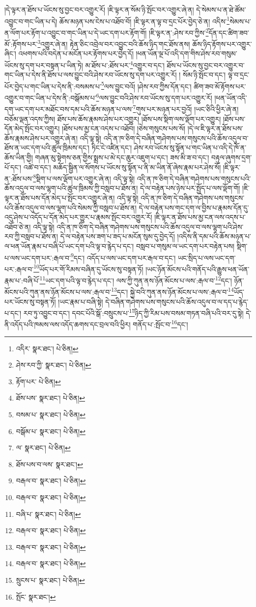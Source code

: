 །དེ་ལྟར་ན་ཐོས་པ་ཡོངས་སུ་བྱང་བར་འགྱུར་རོ། །ཇི་ལྟར་ན་སོམ་ཉི་སྤོང་བར་འགྱུར་ཞེ་ན། དེ་སེམས་པ་ན་ཐེ་ཚོམ་འབྱུང་བ་གང་ཡིན་པ་དེ། ཆོས་མཉན་པས་ངེས་པ་འཐོབ་བོ། །ཇི་ལྟར་ན་ལྟ་བ་དྲང་པོར་བྱེད་ཅེ་ན། འདིས་\footnote{འདིར་  སྣར་ཐང་།  པེ་ཅིན། }སེམས་པ་ན་ལོག་པར་རྟོག་པ་འབྱུང་བ་གང་ཡིན་པ་དེ་ཡང་དག་པར་རྟོག་གོ། །ཇི་ལྟར་ན་:ཤེས་རབ་ཀྱིས་\footnote{ཤེས་རབ་ཀྱི་  སྣར་ཐང་།  པེ་ཅིན། }དོན་དང་ཚིག་ཟབ་མོ་:རྟོགས་པར་\footnote{རྟོག་པར་  པེ་ཅིན། }འགྱུར་ཞེ་ན། རྟེན་ཅིང་འབྲེལ་བར་འབྱུང་བའི་ཆོས་ཉིད་གང་ཐོས་ནས། ཆོས་ཉིད་རྟོགས་པར་འགྱུར་ཞིང་། འཕགས་པའི་བདེན་པ་མངོན་པར་རྟོགས་པར་བྱེད་དོ། །ཕན་ཡོན་ལྔ་པོ་འདི་དག་གིས་ཤེས་རབ་གསུམ་ཡོངས་སུ་དག་པར་བསྟན་པ་ཡིན་ཏེ། མ་ཐོས་པ་:ཐོས་པར་\footnote{ཐོས་པས་  སྣར་ཐང་།  པེ་ཅིན། }འགྱུར་བ་དང་། ཐོས་པ་ཡོངས་སུ་བྱང་བར་འགྱུར་བ་གང་ཡིན་པ་དེས་ནི་ཐོས་པ་ལས་བྱུང་བའི་ཤེས་རབ་ཡོངས་སུ་དག་པར་འགྱུར་རོ། །
སོམ་ཉི་སྤོང་བ་དང་། ལྟ་བ་དྲང་པོར་བྱེད་པ་གང་ཡིན་པ་དེས་ནི་:བསམས་པ་\footnote{བསམ་པ་  སྣར་ཐང་།  པེ་ཅིན། }ལས་བྱུང་བའོ། །ཤེས་རབ་ཀྱིས་དོན་དང་། ཚིག་ཟབ་མོ་རྟོགས་པར་འགྱུར་བ་གང་ཡིན་པ་དེས་ནི་:བསྒོམས་པ་\footnote{བསྒོམ་པ་  སྣར་ཐང་།  པེ་ཅིན། }ལས་བྱུང་བའི་ཤེས་རབ་ཡོངས་སུ་དག་པར་འགྱུར་རོ། །ཕན་ཡོན་འདི་དག་ཡང་དག་པར་མཐོང་བས་དམ་པའི་ཆོས་མཉན་པ་ལས་\footnote{ལ་  སྣར་ཐང་།  པེ་ཅིན། }གུས་པར་མཉན་པར་བྱའོ། །ཡང་ཅིའི་ཕྱིར་ཞེ་ན། བཅོམ་ལྡན་འདས་ཀྱིས། ཐོས་པས་ཆོས་རྣམས་ཤེས་པར་འགྱུར། །ཐོས་པས་སྡིག་ལས་ལྡོག་པར་འགྱུར། །ཐོས་པས་དོན་མེད་སྤོང་བར་འགྱུར། །ཐོས་པས་མྱ་ངན་འདས་པ་འཐོབ། །ཅེས་གསུངས་པས་སོ། །དེ་ལ་ཇི་ལྟར་ན་ཐོས་པས་ཆོས་རྣམས་ཤེས་པར་འགྱུར་ཞེ་ན། འདི་ལྟ་སྟེ། འདི་ན་ཁ་ཅིག་དེ་བཞིན་གཤེགས་པས་གསུངས་པའི་ཆོས་འདུལ་བ་ཐོས་ན་ཡང་དག་པའི་ཚུལ་ཁྲིམས་དང་། ཏིང་ངེ་འཛིན་དང་། ཤེས་རབ་ཡོངས་སུ་སྟོན་པ་གང་ཡིན་པ་འདི་དེ་ཁོ་ན་ཆོས་ཡིན་གྱི། གཞན་མུ་སྟེགས་ཅན་གྱིས་སྨྲས་པ་མེ་དང་ཆུར་འཇུག་པ་དང་། ཟས་མི་ཟ་བ་དང་། བརྟུལ་ཞུགས་དྲག་པོ་དང་། འཚེ་བ་དང་། མཆོད་སྦྱིན་ལ་སོགས་པ་ཡོངས་སུ་སྟོན་པ་ནི་མ་ཡིན་ནོ་ཞེས་རྣམ་པར་ཤེས་སོ། །ཇི་ལྟར་ན་:ཐོས་པས་\footnote{ཐོས་པས་བ་ལས་  སྣར་ཐང་། }སྡིག་པ་ལས་ལྡོག་པར་འགྱུར་ཞེ་ན། འདི་ལྟ་སྟེ། འདི་ན་ཁ་ཅིག་དེ་བཞིན་གཤེགས་པས་གསུངས་པའི་ཆོས་འདུལ་བ་ལས་ལྷག་པའི་ཚུལ་ཁྲིམས་ཀྱི་བསླབ་པ་ཐོས་ན། དེ་ལ་བརྟེན་པས་ཉེས་པར་སྤྱོད་པ་ལས་ལྡོག་གོ། །ཇི་ལྟར་ན་ཐོས་པས་དོན་མེད་པ་སྤོང་བར་འགྱུར་ཞེ་ན། འདི་ལྟ་སྟེ། འདི་ན་ཁ་ཅིག་དེ་བཞིན་གཤེགས་པས་གསུངས་པའི་ཆོས་འདུལ་བ་ལས་ལྷག་པའི་སེམས་ཀྱི་བསླབ་པ་ཐོས་ན། དེ་ལ་བརྟེན་པས་གང་དག་ལ་བྱིས་པ་རྣམས་དོན་དུ་འདུ་ཤེས་པ་འདོད་པ་དོན་མེད་པར་གྱུར་པ་རྣམས་སྤོང་བར་འགྱུར་རོ། །ཇི་ལྟར་ན་ཐོས་པས་མྱ་ངན་ལས་འདས་པ་འཐོབ་ཅེ་ན། འདི་ལྟ་སྟེ། འདི་ན་ཁ་ཅིག་དེ་བཞིན་གཤེགས་པས་གསུངས་པའི་ཆོས་འདུལ་བ་ལས་ལྷག་པའི་ཤེས་རབ་ཀྱི་བསླབ་པ་ཐོས་ན། དེ་ལ་བརྟེན་པས་ཟག་པ་ཟད་པ་མངོན་སུམ་དུ་བྱེད་དོ། །འདིས་ནི་དམ་པའི་ཆོས་མཉན་པ་ལ་ཕན་ཡོན་རྣམ་པ་བཞི་པོ་ཡང་དག་པའི་ལྟ་བ་རྙེད་པ་དང་། བསླབ་པ་གསུམ་ལ་ཡང་དག་པར་བརྟེན་པས། སྡིག་པ་ལས་ཡང་དག་པར་:རྒལ་བ་\footnote{བརྒལ་བ་  སྣར་ཐང་།  པེ་ཅིན། }དང་། འདོད་པ་ལས་ཡང་དག་པར་རྒལ་བ་དང་། ཡང་སྲིད་པ་ལས་ཡང་དག་པར་:རྒལ་བ་\footnote{བརྒལ་བ་  སྣར་ཐང་།  པེ་ཅིན། }ཡོད་པར་གོ་རིམས་བཞིན་དུ་ཡོངས་སུ་བསྟན་ཏོ། །ཡང་ཉོན་མོངས་པའི་གནོད་པའི་རྒྱུས་ཕན་ཡོན་རྣམ་པ་:བཞི་པོ་\footnote{བཞི་པ་  སྣར་ཐང་།  པེ་ཅིན། }ཡང་དག་པའི་ལྟ་བ་རྙེད་པ་དང་། ལས་ཀྱི་ཀུན་ནས་ཉོན་མོངས་པ་ལས་:རྒལ་བ་\footnote{བརྒལ་བ་  སྣར་ཐང་།  པེ་ཅིན། }དང་། ཉོན་མོངས་པའི་ཀུན་ནས་ཉོན་མོངས་པ་ལས་:རྒལ་བ་\footnote{བརྒལ་བ་  སྣར་ཐང་།  པེ་ཅིན། }དང་། སྐྱེ་བའི་ཀུན་ནས་ཉོན་མོངས་པ་ལས་:རྒལ་བ་\footnote{བརྒལ་བ་  སྣར་ཐང་།  པེ་ཅིན། }ཡོད་པར་ཡོངས་སུ་བསྟན་ཏོ། །ཡང་རྣམ་པ་བཞི་སྟེ། དེ་བཞིན་གཤེགས་པས་གསུངས་པའི་ཆོས་འདུལ་བ་ལ་དད་པ་རྙེད་པ་དང་། རབ་ཏུ་འབྱུང་བ་དང་། དབང་པོའི་སྒོ་:བསྲུངས་པ་\footnote{སྲུངས་པ་  སྣར་ཐང་།  པེ་ཅིན། }ཉིད་ཀྱི་རིམ་པས་བསམ་གཏན་བཞི་པའི་བར་དུ་སྟེ། དེ་ནི་འདོད་པའི་ཁམས་ལས་འདོད་ཆགས་དང་བྲལ་བའི་ཕྱིར། གནོད་པ་:སྤོང་བ་\footnote{སྤོང་  སྣར་ཐང་། }དང་། 